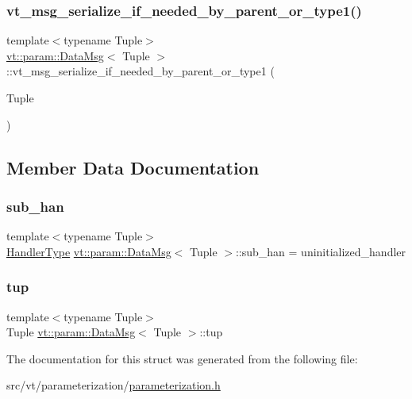 \subsubsection{\texorpdfstring{vt\+\_\+msg\+\_\+serialize\+\_\+if\+\_\+needed\+\_\+by\+\_\+parent\+\_\+or\+\_\+type1()}{vt\_msg\_serialize\_if\_needed\_by\_parent\_or\_type1()}}
{\footnotesize\ttfamily template$<$typename Tuple$>$ \\
\hyperlink{structvt_1_1param_1_1_data_msg}{vt\+::param\+::\+Data\+Msg}$<$ Tuple $>$\+::vt\+\_\+msg\+\_\+serialize\+\_\+if\+\_\+needed\+\_\+by\+\_\+parent\+\_\+or\+\_\+type1 (\begin{DoxyParamCaption}\item[{Tuple}]{ }\end{DoxyParamCaption})}



\subsection{Member Data Documentation}
\mbox{\label{structvt_1_1param_1_1_data_msg_a5356937e3d47eff93d8b0c59247c5809}} 
\subsubsection{\texorpdfstring{sub\+\_\+han}{sub\_han}}
{\footnotesize\ttfamily template$<$typename Tuple$>$ \\
\hyperlink{namespacevt_af64846b57dfcaf104da3ef6967917573}{Handler\+Type} \hyperlink{structvt_1_1param_1_1_data_msg}{vt\+::param\+::\+Data\+Msg}$<$ Tuple $>$\+::sub\+\_\+han = uninitialized\+\_\+handler}

\mbox{\label{structvt_1_1param_1_1_data_msg_aa607f9d80d37b1c72f284ea3048e5788}} 
\subsubsection{\texorpdfstring{tup}{tup}}
{\footnotesize\ttfamily template$<$typename Tuple$>$ \\
Tuple \hyperlink{structvt_1_1param_1_1_data_msg}{vt\+::param\+::\+Data\+Msg}$<$ Tuple $>$\+::tup}



The documentation for this struct was generated from the following file\+:\begin{DoxyCompactItemize}
\item 
src/vt/parameterization/\hyperlink{parameterization_8h}{parameterization.\+h}\end{DoxyCompactItemize}
